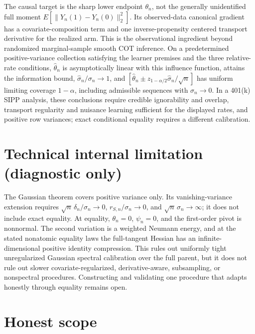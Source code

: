 \documentclass{article}
\begin{document}
The causal target is the sharp lower endpoint \(\theta_n\), not the generally unidentified full moment \(E[\lVert Y_n(1)-Y_n(0)\rVert_2^2]\). Its observed-data canonical gradient has a covariate-composition term and one inverse-propensity centered transport derivative for the realized arm. This is the observational ingredient beyond randomized marginal-sample smooth COT inference. On a predetermined positive-variance collection satisfying the learner premises and the three relative-rate conditions, \(\widehat\theta_n\) is asymptotically linear with this influence function, attains the information bound, \(\widehat\sigma_n/\sigma_n\to1\), and \([\widehat\theta_n\mathbin\pm z_{1-\alpha/2}\widehat\sigma_n/\sqrt n]\) has uniform limiting coverage \(1-\alpha\), including admissible sequences with \(\sigma_n\to0\). In a 401(k) SIPP analysis, these conclusions require credible ignorability and overlap, transport regularity and nuisance learning sufficient for the displayed rates, and positive row variances; exact conditional equality requires a different calibration.

\section*{Technical internal limitation (diagnostic only)}

The Gaussian theorem covers positive variance only. Its vanishing-variance extension requires \(\sqrt n\,\delta_n/\sigma_n\to0\), \(r_{S,n}/\sigma_n\to0\), and \(\sqrt n\,\sigma_n\to\infty\); it does not include exact equality. At equality, \(\theta_n=0\), \(\psi_n=0\), and the first-order pivot is nonnormal. The second variation is a weighted Neumann energy, and at the stated nonatomic equality laws the full-tangent Hessian has an infinite-dimensional positive identity compression. This rules out uniformly tight unregularized Gaussian spectral calibration over the full parent, but it does not rule out slower covariate-regularized, derivative-aware, subsampling, or nonspectral procedures. Constructing and validating one procedure that adapts honestly through equality remains open.

\section{Honest scope}
\end{document}
